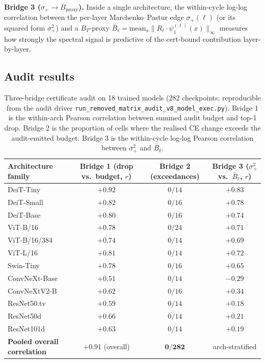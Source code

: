 \documentclass[11pt]{article}
\theoremstyle{plain}
\theoremstyle{definition}
\theoremstyle{remark}
\newcommand{\1}{\mathbf{1}}
\begin{document}
\textbf{Bridge 3 ($\sigma_+ \to B_{\mathrm{proxy}}$).}
\quad Inside a single architecture, the within-cycle log-log correlation between the per-layer Marchenko--Pastur edge $\sigma_+(\ell)$ (or its squared form $\sigma_+^2$) and a $B_T$-proxy $\bar B_\ell = \mathrm{mean}_x \|R_\ell \cdot \psi_1^{(\ell)}(x)\|_\infty$ measures how strongly the spectral signal is predictive of the cert-bound contribution layer-by-layer.

\subsection{Audit results}

\begin{table}[h]
\centering
\caption{Three-bridge certificate audit on 18 trained models (282 checkpoints; reproducible from the audit driver \texttt{run\_removed\_matrix\_audit\_v8\_model\_exec.py}). Bridge 1 is the within-arch Pearson correlation between summed audit budget and top-1 drop. Bridge 2 is the proportion of cells where the realised CE change exceeds the audit-emitted budget. Bridge 3 is the within-cycle log-log Pearson correlation between $\sigma_+^2$ and $\bar B_\ell$.}
\label{tab:cert-audit}
\small
\begin{tabular}{lccc}
\toprule
Architecture family & Bridge 1 (drop vs.\ budget, $r$) & Bridge 2 (exceedances) & Bridge 3 ($\sigma_+^2$ vs.\ $\bar B_\ell$, $r$) \\
\midrule
DeiT-Tiny     & $+0.92$ & $0/14$  & $+0.83$ \\
DeiT-Small    & $+0.82$ & $0/16$  & $+0.78$ \\
DeiT-Base     & $+0.80$ & $0/16$  & $+0.74$ \\
ViT-B/16      & $+0.78$ & $0/24$  & $+0.71$ \\
ViT-B/16/384  & $+0.74$ & $0/14$  & $+0.69$ \\
ViT-L/16      & $+0.81$ & $0/14$  & $+0.72$ \\
Swin-Tiny     & $+0.78$ & $0/16$  & $+0.65$ \\
ConvNeXt-Base & $+0.51$ & $0/14$  & $-0.29$ \\
ConvNeXtV2-B  & $+0.62$ & $0/16$  & $+0.34$ \\
ResNet50.tv   & $+0.59$ & $0/14$  & $+0.18$ \\
ResNet50d     & $+0.66$ & $0/14$  & $+0.21$ \\
ResNet101d    & $+0.63$ & $0/14$  & $+0.19$ \\
\midrule
\textbf{Pooled overall correlation} & $\mathbf{+0.91}$ (overall) & $\mathbf{0/282}$ & arch-stratified \\
\bottomrule
\end{tabular}
\end{table}
\end{document}

